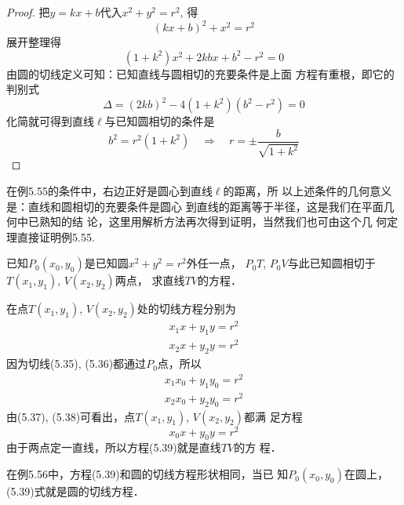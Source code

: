 \begin{proof}
    把$y=kx+b$代入$x^2+y^2=r^2$, 得
\[(kx+b)^2+x^2=r^2\]
展开整理得
\[(1+k^2)x^2+2kbx+b^2-r^2=0\]
由圆的切线定义可知：已知直线与圆相切的充要条件是上面
方程有重根，即它的判别式
\[\Delta=(2kb)^2-4(1+k^2)(b^2-r^2)=0\]
化简就可得到直线$\ell$与已知圆相切的条件是
\[
    b^2=r^2(1+k^2)\quad \Rightarrow\quad   r=\pm\frac{b}{\sqrt{1+k^2}}
\]
\end{proof}

在例5.55的条件中，右边正好是圆心到直线$\ell$的距离，所
以上述条件的几何意义是：直线和圆相切的充要条件是圆心
到直线的距离等于半径，这是我们在平面几何中已熟知的结
论，这里用解析方法再次得到证明，当然我们也可由这个几
何定理直接证明例5.55.

\begin{example}
    已知$P_0(x_0,y_0)$是已知圆$x^2+y^2=r^2$外任一点，
$P_0T$, $P_0V$与此已知圆相切于$T(x_1,y_1)$, $V(x_2,y_2)$两点，
求直线$TV$的方程．
\end{example}


\begin{solution}
    在点$T(x_1,y_1)$, $V(x_2,y_2)$处的切线方程分别为
\begin{align}
    x_1x+y_1y=r^2\\
    x_2x+y_2y=r^2
\end{align}
因为切线(5.35), (5.36)都通过$P_0$点，所以
\begin{align}
    x_1x_0+y_1y_0=r^2\\
    x_2x_0+y_2y_0=r^2
\end{align}
由(5.37), (5.38)可看出，点$T(x_1,y_1)$, $V(x_2,y_2)$都满
足方程
\begin{equation}
    x_0x+y_0y=r^2
\end{equation}
由于两点定一直线，所以方程(5.39)就是直线$TV$的方
程．
\end{solution}


在例5.56中，方程(5.39)和圆的切线方程形状相同，当已
知$P_0(x_0,y_0)$在圆上，(5.39)式就是圆的切线方程．

